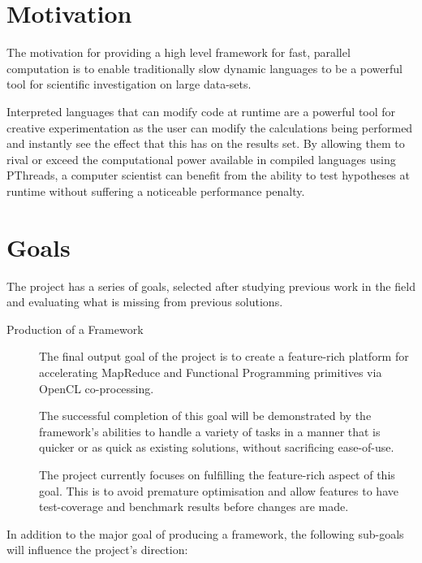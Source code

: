 \section{Motivation}

The motivation for providing a high level framework for fast, parallel computation is to enable traditionally slow dynamic languages to be a powerful tool for scientific investigation on large data-sets.

Interpreted languages that can modify code at runtime are a powerful tool for creative experimentation as the user can modify the calculations being performed and instantly see the effect that this has on the results set. By allowing them to rival or exceed the computational power available in compiled languages using PThreads, a computer scientist can benefit from the ability to test hypotheses at runtime without suffering a noticeable performance penalty.

\section{Goals}

The project has a series of goals, selected after studying previous work in the field and evaluating what is missing from previous solutions.

\begin{description}
  \item[Production of a Framework]
  The final output goal of the project is to create a feature-rich platform for accelerating MapReduce and Functional Programming primitives via OpenCL co-processing.

  The successful completion of this goal will be demonstrated by the framework's abilities to handle a variety of tasks in a manner that is quicker or as quick as existing solutions, without sacrificing ease-of-use.

  The project currently focuses on fulfilling the feature-rich aspect of this goal. This is to avoid premature optimisation and allow features to have test-coverage and benchmark results before changes are made.
\end{description}

In addition to the major goal of producing a framework, the following sub-goals will influence the project's direction:

